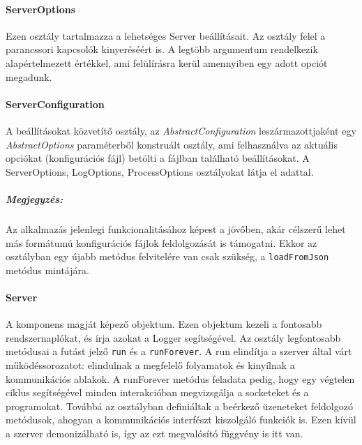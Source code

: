 \documentclass[12pt]{report}
\begin{document}
  \paragraph{ServerOptions}
  Ezen osztály tartalmazza a lehetséges Server beállításait. Az osztály felel a parancssori kapcsolók kinyeréséért is. A legtöbb argumentum rendelkezik alapértelmezett értékkel, ami felülírásra kerül amennyiben egy adott opciót megadunk.
  \paragraph{ServerConfiguration}
A beállításokat közvetítő osztály, az \textit{AbstractConfiguration} leszármazottjaként egy \textit{AbstractOptions} paraméterből konstruált osztály, ami felhasználva az aktuális opciókat (konfigurációs fájl) betölti a fájlban található beállításokat. A ServerOptions, LogOptions, ProcessOptions osztályokat látja el adattal.
  \subparagraph{Megjegyzés:}
  Az alkalmazás jelenlegi funkcionalitásához képest a jövőben, akár célszerű lehet más formátumú konfigurációs fájlok feldolgozását is támogatni. Ekkor az osztályban egy újabb metódus felvitelére van csak szükség, a \verb|loadFromJson| metódus mintájára.
  \paragraph{Server}
  A komponens magját képező objektum. Ezen objektum kezeli a fontosabb rendszernaplókat, és írja azokat a Logger segítségével. Az osztály legfontosabb metódusai a futást jelző \verb|run| és a \verb|runForever|. A run elindítja a szerver által várt működéssorozatot:  elindulnak a megfelelő folyamatok és kinyílnak a kommunikációs ablakok. A runForever metódus feladata pedig, hogy egy végtelen ciklus segítségével minden interakcióban megvizsgálja a socketeket és a programokat. Továbbá az osztályban definiáltak a beérkező üzeneteket feldolgozó metódusok, ahogyan a kommunikációs interfészt kiszolgáló funkciók is.
  Ezen kívül a szerver demonizálható is, így az ezt megvalósító függvény is itt van.
  
\end{document}
